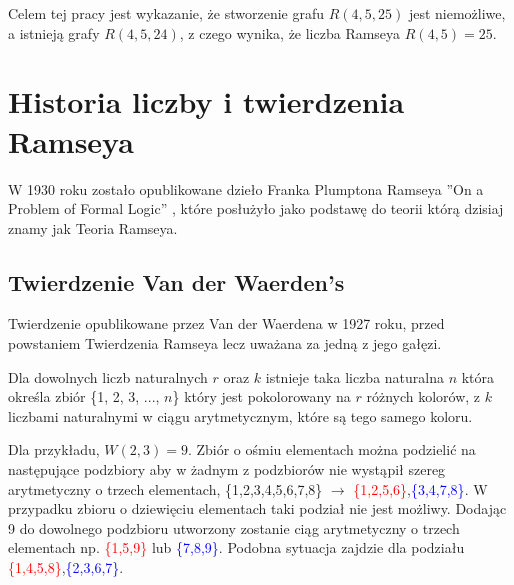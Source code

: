  \begin{figure}[H]
  \centering
    \caption{}
    \label{pgram}
 \end{figure}

Celem tej pracy jest wykazanie, że stworzenie grafu $R(4,5,25)$ jest niemożliwe, a istnieją grafy $R(4,5,24)$, z czego wynika, że liczba Ramseya $R(4,5) = 25$.


\section{Historia liczby i twierdzenia Ramseya}

W 1930 roku zostało opublikowane dzieło Franka Plumptona Ramseya ''On a Problem of Formal Logic''\cite{ramsey} , które posłużyło jako podstawę do teorii którą dzisiaj znamy jak Teoria Ramseya. 


\subsection{Twierdzenie Van der Waerden's}
Twierdzenie opublikowane przez Van der Waerdena w 1927 roku, przed powstaniem Twierdzenia Ramseya lecz uważana za jedną z jego gałęzi. 

\begin{theorem}
Dla dowolnych liczb naturalnych $r$ oraz $k$ istnieje taka liczba naturalna $n$ która określa zbiór \{1, 2, 3, ..., $n$\} który jest pokolorowany na $r$ różnych kolorów, z $k$ liczbami naturalnymi w ciągu arytmetycznym, które są tego samego koloru.\cite{theory} 
\end{theorem}

Dla przykładu, $W(2,3) = 9$. Zbiór o ośmiu elementach można podzielić na następujące podzbiory aby w żadnym z podzbiorów nie wystąpił szereg arytmetyczny o trzech elementach, \{1,2,3,4,5,6,7,8\} $\to$ \textcolor{red}{\{1,2,5,6\}},\textcolor{blue}{\{3,4,7,8\}}. W przypadku zbioru o dziewięciu elementach taki podział nie jest możliwy. Dodając 9 do dowolnego podzbioru utworzony zostanie ciąg arytmetyczny o trzech elementach np. \textcolor{red}{\{1,5,9\}} lub \textcolor{blue}{\{7,8,9\}}. Podobna sytuacja zajdzie dla podziału \textcolor{red}{\{1,4,5,8\}},\textcolor{blue}{\{2,3,6,7\}}.

